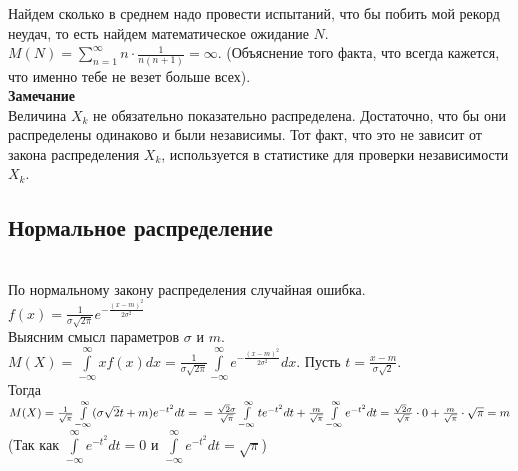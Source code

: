 \documentclass[russian, 12pt, fleqn]{article}
\begin{document}
Найдем сколько в среднем надо провести испытаний, что бы побить мой рекорд неудач, то есть найдем математическое ожидание $N$. $M(N) = \sum\limits_{n=1}^{\infty} n\cdot  \frac{1}{n(n+1)} = \infty$. (Объяснение того факта, что всегда кажется, что именно тебе не везет больше всех).\\
\textbf{Замечание\ } \\
\noindent
Величина $X_k$ не обязательно показательно распределена. Достаточно, что бы они распределены одинаково и были независимы. Тот факт, что это не зависит от закона распределения $X_k$, используется в статистике для проверки независимости $X_k$.\\
\subsection{Нормальное распределение}
\noindent
{}
\\
По нормальному закону распределения случайная ошибка.\\
$f(x) = \frac{1}{\sigma \sqrt{2\pi}}e^{-\frac{(x-m)^2}{2\sigma^2}}$\\
Выясним смысл параметров $\sigma$ и $m$.\\
$M(X) = \int\limits_{-\infty}^{\infty}   xf(x)dx = \frac{1}{\sigma \sqrt{2\pi} } \int\limits_{-\infty}^{\infty}e^{-\frac{(x-m)^2}{2\sigma^2}}dx$. Пусть $t = \frac{x - m}{\sigma\sqrt{2}}$.\\
Тогда $M(X)  = \frac{1}{\sqrt{\pi}}\int\limits_{-\infty}^{\infty}(\sigma \sqrt{2}t+m)e^{-t^2}dt =\\ = \frac{\sqrt{2}\sigma}{\sqrt{\pi}}\int\limits_{-\infty}^{\infty} te^{-t^2}dt + \frac{m}{\sqrt{\pi}} \int\limits_{-\infty}^{\infty} e^{-t^2}dt =  \frac{\sqrt{2}\sigma}{\sqrt{\pi}} \cdot 0 + \frac{m}{\sqrt{\pi}} \cdot \sqrt{\pi} = m$\\
(Так как $\int\limits_{-\infty}^{\infty} e^{-t^2}dt = 0$ и $\int\limits_{-\infty}^{\infty} e^{-t^2}dt = \sqrt{\pi}$)\\
\end{document}
